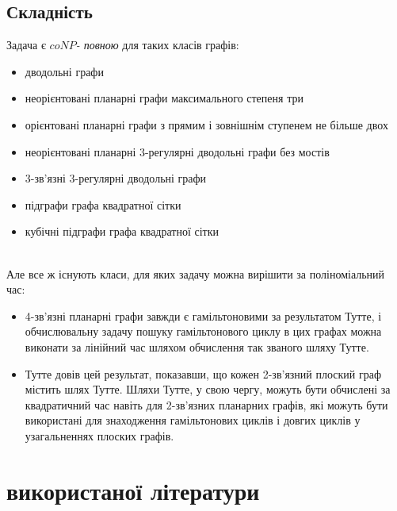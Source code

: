 \documentclass[14pt]{article}
\begin{document}
\begin{spacing}{1.175}
            \subsection{\normalfont Складність}

            Задача є \(coNP\)\textit{- повною} для таких класів графів:
            \begin{itemize}
                \item дводольні графи
                \item неорієнтовані планарні графи максимального степеня три
                \item орієнтовані планарні графи з прямим і зовнішнім ступенем не більше двох
                \item неорієнтовані планарні 3-регулярні дводольні графи без мостів 
                \item 3-зв'язні 3-регулярні дводольні графи
                \item підграфи графа квадратної сітки
                \item кубічні підграфи графа квадратної сітки
            \end{itemize}
            \\
        Але все ж існують класи, для яких задачу можна вирішити за поліноміальний час:
            \begin{itemize}
                \item 4-зв’язні планарні графи завжди є гамільтоновими за результатом Тутте, і обчислювальну задачу пошуку гамільтонового циклу в цих графах можна виконати за лінійний час шляхом обчислення так званого шляху Тутте.
                \item Тутте довів цей результат, показавши, що кожен 2-зв’язний плоский граф містить шлях Тутте. Шляхи Тутте, у свою чергу, можуть бути обчислені за квадратичний час навіть для 2-зв’язних планарних графів, які можуть бути використані для знаходження гамільтонових циклів і довгих циклів у узагальненнях плоских графів.
            \end{itemize}
    \newpage
    \section{ використаної літератури}
    

\end{spacing}
\end{document}
